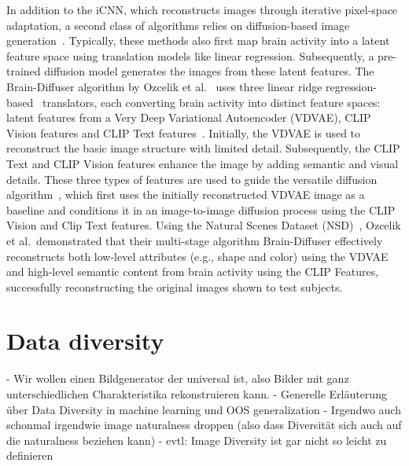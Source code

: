In addition to the iCNN, which reconstructs images through iterative pixel-space adaptation, a second class of algorithms relies on diffusion-based image generation~\cite{takagiHighResolutionImageReconstruction,ozcelikNaturalSceneReconstruction2023,scottiMindEye2SharedSubjectModels2024}. Typically, these methods also first map brain activity into a latent feature space using translation models like linear regression. Subsequently, a pre-trained diffusion model generates the images from these latent features. The Brain-Diffuser algorithm by Ozcelik et al.~\cite{ozcelikNaturalSceneReconstruction2023} uses three linear ridge regression-based~\cite{hoerlRidgeRegressionBiased1970} translators, each converting brain activity into distinct feature spaces: latent features from a Very Deep Variational Autoencoder (VDVAE)\cite{childVeryDeepVAEs2020},  CLIP Vision features and CLIP Text features~\cite{radfordLearningTransferableVisual2021}. Initially, the VDVAE is used to reconstruct the basic image structure with limited detail. Subsequently, the CLIP Text and CLIP Vision features enhance the image by adding semantic and visual details. These three types of features are used to guide the versatile diffusion algorithm~\cite{xuVersatileDiffusionText2024}, which first uses the initially reconstructed VDVAE image as a baseline and conditions it in an image-to-image diffusion process using the CLIP Vision and Clip Text features. Using the Natural Scenes Dataset (NSD)~\cite{allenMassive7TFMRI2022}, Ozcelik et al.\ demonstrated that their multi-stage algorithm Brain-Diffuser effectively reconstructs both low-level attributes (e.g., shape and color) using the VDVAE and high-level semantic content from brain activity using the CLIP Features, successfully reconstructing the original images shown to test subjects.




\section{Data diversity}
- Wir wollen einen Bildgenerator der universal ist, also Bilder mit ganz unterschiedlichen Charakteristika rekonstruieren kann.
- Generelle Erläuterung über Data Diversity in machine learning und OOS generalization
- Irgendwo auch schonmal irgendwie image naturalness droppen (also dass Diversität sich auch auf die naturalness beziehen kann)
- evtl: Image Diversity ist gar nicht so leicht zu definieren

